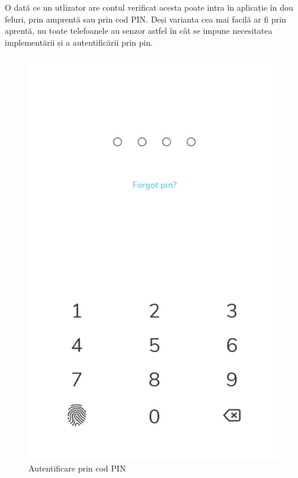 \documentclass[12pt]{article}
\begin{document}
O dată ce un utlizator are contul verificat acesta poate intra în aplicație
în dou feluri, prin amprentă sau prin cod PIN. Deși varianta cea mai facilă ar fi prin
aprentă, nu toate telefoanele au senzor astfel în cât se impune necesitatea implementării
și a autentificării prin pin.

\begin{figure}[H]
\centering
\begin{minipage}[b]{0.4\textwidth}
    \includegraphics[width=\textwidth]{pin.png}
    \caption{Autentificare prin cod PIN}
\end{minipage}
\hfill
\begin{minipage}[b]{0.4\textwidth}

\end{minipage}
\end{figure}
\end{document}
